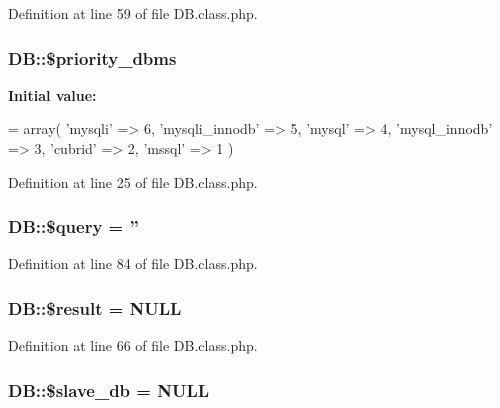 Definition at line 59 of file D\-B.\-class.\-php.

\hypertarget{classDB_a082292b9ca3855cbddd3a74e9490ca82}{
\subsubsection[{\$priority\-\_\-dbms}]{\setlength{\rightskip}{0pt plus 5cm}D\-B\-::\$priority\-\_\-dbms}}\label{classDB_a082292b9ca3855cbddd3a74e9490ca82}
{\bfseries Initial value\-:}
\begin{DoxyCode}
= array(
        \textcolor{stringliteral}{'mysqli'} => 6,
        \textcolor{stringliteral}{'mysqli\_innodb'} => 5,
        \textcolor{stringliteral}{'mysql'} => 4,
        \textcolor{stringliteral}{'mysql\_innodb'} => 3,
        \textcolor{stringliteral}{'cubrid'} => 2,
        \textcolor{stringliteral}{'mssql'} => 1
    )
\end{DoxyCode}


Definition at line 25 of file D\-B.\-class.\-php.

\hypertarget{classDB_a32ebabea908efd805a83db48fec3ab52}{
\subsubsection[{\$query}]{\setlength{\rightskip}{0pt plus 5cm}D\-B\-::\$query = ''}}\label{classDB_a32ebabea908efd805a83db48fec3ab52}


Definition at line 84 of file D\-B.\-class.\-php.

\hypertarget{classDB_a74e74ee9d3311aa1e8107b8accd05e29}{
\subsubsection[{\$result}]{\setlength{\rightskip}{0pt plus 5cm}D\-B\-::\$result = N\-U\-L\-L}}\label{classDB_a74e74ee9d3311aa1e8107b8accd05e29}


Definition at line 66 of file D\-B.\-class.\-php.

\hypertarget{classDB_a0a811a4446882ee9edf0ed846e8926f3}{
\subsubsection[{\$slave\-\_\-db}]{\setlength{\rightskip}{0pt plus 5cm}D\-B\-::\$slave\-\_\-db = N\-U\-L\-L}}\label{classDB_a0a811a4446882ee9edf0ed846e8926f3}


